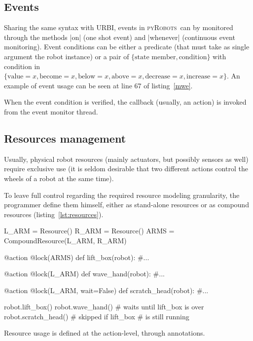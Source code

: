 \documentclass[a4paper, 10pt, conference]{ieeeconf}      %
\newcommand{\pyRobots}{\textsc{pyRobots}\ }
\begin{document}
\subsection{Events}

Sharing the same syntax with URBI, events in \pyRobots can by monitored through
the methods \python|on| (one shot event) and \python|whenever| (continuous event
monitoring). Event conditions can be either a predicate (that must take as
single argument the robot instance) or a pair of $\{\text{state member},
\text{condition}\}$ with condition in $\{\text{value}=x, \text{become}=x,
\text{below}=x, \text{above}=x, \text{decrease}=x, \text{increase}=x\}$. An
example of event usage can be seen at line 67 of listing~\ref{mwe}.

When the event condition is verified, the callback (usually, an action) is
invoked from the event monitor thread.

\subsection{Resources management}

Usually, physical robot resources (mainly actuators, but possibly sensors as
well) require exclusive use (it is seldom desirable that two different actions
control the wheels of a robot at the same time). 

To leave full control regarding the required resource modeling granularity, the
programmer define them himself, either as stand-alone resources or as compound
resources (listing~\ref{lst:resources}).

\begin{listing}[H]
\begin{pythoncode}
    L_ARM = Resource()
    R_ARM = Resource()
    ARMS = CompoundResource(L_ARM, R_ARM)

    @action
    @lock(ARMS)
    def lift_box(robot):
        #...

    @action
    @lock(L_ARM)
    def wave_hand(robot):
        #...

    @action
    @lock(L_ARM, wait=False)
    def scratch_head(robot):
        #...

    robot.lift_box()
    robot.wave_hand() # waits until lift_box is over
    robot.scratch_head() # skipped if lift_box 
                         # is still running

\end{pythoncode}
\caption{Resource usage is defined at the action-level, through annotations.}
\label{lst:resources}
\end{listing}
\end{document}
